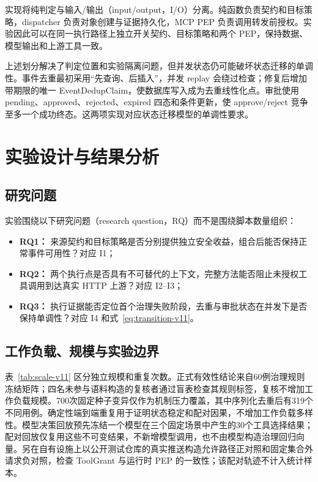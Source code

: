 实现将纯判定与输入/输出（input/output，I/O）分离。纯函数负责契约和目标策略，dispatcher 负责对象创建与证据持久化，MCP PEP 负责调用转发前授权。实验因此可以在同一执行路径上独立开关契约、目标策略和两个 PEP，保持数据、模型输出和上游工具一致。

上述划分解决了判定位置和实验隔离问题，但并发状态仍可能破坏状态迁移的单调性。事件去重最初采用“先查询、后插入”，并发 replay 会绕过检查；修复后增加带期限的唯一 EventDedupClaim，使数据库写入成为去重线性化点。审批使用 pending、approved、rejected、expired 四态和条件更新，使 approve/reject 竞争至多一个成功终态。这两项实现对应状态迁移模型的单调性要求。

\section{实验设计与结果分析}\label{sec:evaluation-v11}

\subsection{研究问题}

实验围绕以下研究问题（research question，RQ）而不是围绕脚本数量组织：
\begin{itemize}
  \item \textbf{RQ1：} 来源契约和目标策略是否分别提供独立安全收益，组合后能否保持正常事件可用性？对应 I1；
  \item \textbf{RQ2：} 两个执行点是否具有不可替代的上下文，完整方法能否阻止未授权工具调用到达真实 HTTP 上游？对应 I2--I3；
  \item \textbf{RQ3：} 执行证据能否定位首个治理失败阶段，去重与审批状态在并发下是否保持单调性？对应 I4 和式~\eqref{eq:transition-v11}。
\end{itemize}

\subsection{工作负载、规模与实验边界}

表~\ref{tab:scale-v11} 区分独立规模和重复次数。正式有效性结论来自60例治理规则冻结矩阵；四名未参与语料构造的复核者通过盲表检查其规则标签，复核不增加工作负载规模。700次固定种子变异仅作为机制压力覆盖，其中序列化去重后有319个不同用例。确定性端到端重复用于证明状态稳定和配对因果，不增加工作负载多样性。模型决策回放预先冻结一个模型在三个固定场景中产生的30个工具选择结果；配对回放仅复用这些不可变结果，不新增模型调用，也不由模型构造治理回归向量。另在自有设施上以公开测试仓库的真实推送构造允许路径正对照和固定集合外请求负对照，检查 ToolGrant 与运行时 PEP 的一致性；该配对轨迹不计入统计样本。

